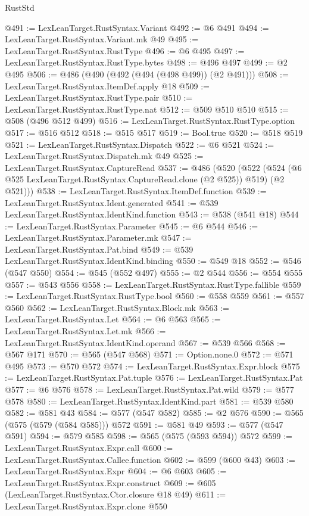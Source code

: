 \begin{lexlean}{RustStd}
\begin{coremodule}
@491 := LexLeanTarget.RustSyntax.Variant
@492 := @6 @491
@494 := LexLeanTarget.RustSyntax.Variant.mk @49
@495 := LexLeanTarget.RustSyntax.RustType
@496 := @6 @495
@497 := LexLeanTarget.RustSyntax.RustType.bytes
@498 := @496 @497
@499 := @2 @495
@506 := @486 (@490 (@492 (@494 (@498 @499)) (@2 @491)))
@508 := LexLeanTarget.RustSyntax.ItemDef.apply @18
@509 := LexLeanTarget.RustSyntax.RustType.pair
@510 := LexLeanTarget.RustSyntax.RustType.nat
@512 := @509 @510 @510
@515 := @508 (@496 @512 @499)
@516 := LexLeanTarget.RustSyntax.RustType.option
@517 := @516 @512
@518 := @515 @517
@519 := Bool.true
@520 := @518 @519
@521 := LexLeanTarget.RustSyntax.Dispatch
@522 := @6 @521
@524 := LexLeanTarget.RustSyntax.Dispatch.mk @49
@525 := LexLeanTarget.RustSyntax.CaptureRead
@537 := @486
    (@520
      (@522 (@524 (@6 @525 LexLeanTarget.RustSyntax.CaptureRead.clone (@2 @525)) @519) (@2 @521)))
@538 := LexLeanTarget.RustSyntax.ItemDef.function
@539 := LexLeanTarget.RustSyntax.Ident.generated
@541 := @539 LexLeanTarget.RustSyntax.IdentKind.function
@543 := @538 (@541 @18)
@544 := LexLeanTarget.RustSyntax.Parameter
@545 := @6 @544
@546 := LexLeanTarget.RustSyntax.Parameter.mk
@547 := LexLeanTarget.RustSyntax.Pat.bind
@549 := @539 LexLeanTarget.RustSyntax.IdentKind.binding
@550 := @549 @18
@552 := @546 (@547 @550)
@554 := @545 (@552 @497)
@555 := @2 @544
@556 := @554 @555
@557 := @543 @556
@558 := LexLeanTarget.RustSyntax.RustType.fallible
@559 := LexLeanTarget.RustSyntax.RustType.bool
@560 := @558 @559
@561 := @557 @560
@562 := LexLeanTarget.RustSyntax.Block.mk
@563 := LexLeanTarget.RustSyntax.Let
@564 := @6 @563
@565 := LexLeanTarget.RustSyntax.Let.mk
@566 := LexLeanTarget.RustSyntax.IdentKind.operand
@567 := @539 @566
@568 := @567 @171
@570 := @565 (@547 @568)
@571 := Option.none.{0}
@572 := @571 @495
@573 := @570 @572
@574 := LexLeanTarget.RustSyntax.Expr.block
@575 := LexLeanTarget.RustSyntax.Pat.tuple
@576 := LexLeanTarget.RustSyntax.Pat
@577 := @6 @576
@578 := LexLeanTarget.RustSyntax.Pat.wild
@579 := @577 @578
@580 := LexLeanTarget.RustSyntax.IdentKind.part
@581 := @539 @580
@582 := @581 @43
@584 := @577 (@547 @582)
@585 := @2 @576
@590 := @565 (@575 (@579 (@584 @585))) @572
@591 := @581 @49
@593 := @577 (@547 @591)
@594 := @579 @585
@598 := @565 (@575 (@593 @594)) @572
@599 := LexLeanTarget.RustSyntax.Expr.call
@600 := LexLeanTarget.RustSyntax.Callee.function
@602 := @599 (@600 @43)
@603 := LexLeanTarget.RustSyntax.Expr
@604 := @6 @603
@605 := LexLeanTarget.RustSyntax.Expr.construct
@609 := @605 (LexLeanTarget.RustSyntax.Ctor.closure @18 @49)
@611 := LexLeanTarget.RustSyntax.Expr.clone @550

\end{coremodule}
\end{lexlean}
